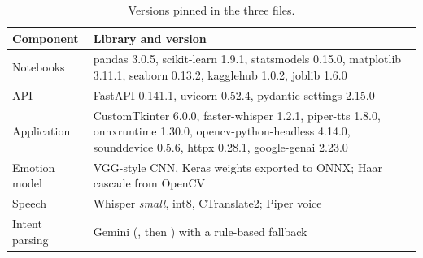 \begin{table}[htbp]
  \centering
  \small
  \begin{tabularx}{\textwidth}{@{}lL@{}}
    \toprule
    Component & Library and version \\
    \midrule
    Notebooks & pandas 3.0.5, scikit-learn 1.9.1, statsmodels 0.15.0, matplotlib 3.11.1, seaborn 0.13.2, kagglehub 1.0.2, joblib 1.6.0 \\
    API & FastAPI 0.141.1, uvicorn 0.52.4, pydantic-settings 2.15.0 \\
    Application & CustomTkinter 6.0.0, faster-whisper 1.2.1, piper-tts 1.8.0, onnxruntime 1.30.0, opencv-python-headless 4.14.0, sounddevice 0.5.6, httpx 0.28.1, google-genai 2.23.0 \\
    Emotion model & VGG-style CNN, Keras weights exported to ONNX; Haar cascade  from OpenCV \\
    Speech & Whisper \emph{small}, int8, CTranslate2; Piper voice  \\
    Intent parsing & Gemini (, then ) with a rule-based fallback \\
    \bottomrule
  \end{tabularx}
  \caption{Versions pinned in the three  files.}
\end{table}
